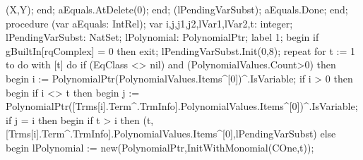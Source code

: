          (X,Y);
      end;
      aEquals.AtDelete(0);
   end;
   (lPendingVarSubst);
   aEquals.Done;
end;
\eatline
{}\nwendcode{}\nwdocspar
\nwenddocs{}\endmoddef\nwstartdeflinemarkup\nwenddeflinemarkup
procedure (var aEquals: IntRel);
var
   i,j,j1,j2,lVar1,lVar2,t: integer;
   lPendingVarSubst: NatSet;
   lPolynomial: PolynomialPtr;
label 1;
begin
   if gBuiltIn[rqComplex] = 0 then exit;
   lPendingVarSubst.Init(0,8);
   repeat
      for t := 1 to  do
         with [t] do
            if (EqClass <> nil) and (PolynomialValues.Count>0) then
            begin
               i := PolynomialPtr(PolynomialValues.Items^[0])^.IsVariable;
               if i > 0 then
               begin
                  if i <> t then
                  begin
                     j := PolynomialPtr([Trms[i].Term^.TrmInfo].PolynomialValues.Items^[0])^.IsVariable;
                     if j = i then
                     begin
                        if t > i then
                           (t,[Trms[i].Term^.TrmInfo].PolynomialValues.Items^[0],lPendingVarSubst)
                        else
                        begin
                           lPolynomial := new(PolynomialPtr,InitWithMonomial(COne,t));
